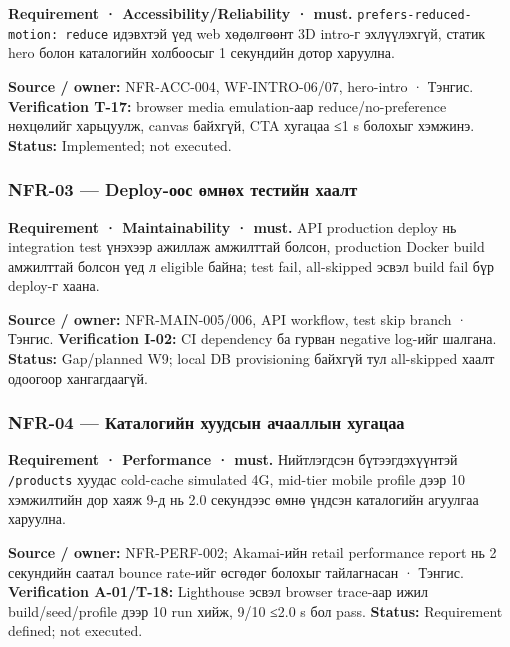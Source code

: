 \documentclass[
  mongolian,
]{article}
\begin{document}
\textbf{Requirement · Accessibility/Reliability · must.}
\texttt{prefers-reduced-motion:\ reduce} идэвхтэй үед web хөдөлгөөнт 3D
intro-г эхлүүлэхгүй, статик hero болон каталогийн холбоосыг 1 секундийн
дотор харуулна.

\textbf{Source / owner:} NFR-ACC-004, WF-INTRO-06/07, hero-intro ·
Тэнгис. \textbf{Verification T-17:} browser media emulation-аар
reduce/no-preference нөхцөлийг харьцуулж, canvas байхгүй, CTA хугацаа ≤1
s болохыг хэмжинэ. \textbf{Status:} Implemented; not executed.

\subsubsection{NFR-03 --- Deploy-оос өмнөх тестийн
хаалт}\label{nfr-03-deploy-ux43eux43eux441-ux4e9ux43cux43dux4e9ux445-ux442ux435ux441ux442ux438ux439ux43d-ux445ux430ux430ux43bux442}

\textbf{Requirement · Maintainability · must.} API production deploy нь
integration test үнэхээр ажиллаж амжилттай болсон, production Docker
build амжилттай болсон үед л eligible байна; test fail, all-skipped
эсвэл build fail бүр deploy-г хаана.

\textbf{Source / owner:} NFR-MAIN-005/006, API workflow, test skip
branch · Тэнгис. \textbf{Verification I-02:} CI dependency ба гурван
negative log-ийг шалгана. \textbf{Status:} Gap/planned W9; local DB
provisioning байхгүй тул all-skipped хаалт одоогоор хангагдаагүй.

\subsubsection{NFR-04 --- Каталогийн хуудсын ачааллын
хугацаа}\label{nfr-04-ux43aux430ux442ux430ux43bux43eux433ux438ux439ux43d-ux445ux443ux443ux434ux441ux44bux43d-ux430ux447ux430ux430ux43bux43bux44bux43d-ux445ux443ux433ux430ux446ux430ux430}

\textbf{Requirement · Performance · must.} Нийтлэгдсэн бүтээгдэхүүнтэй
\texttt{/products} хуудас cold-cache simulated 4G, mid-tier mobile
profile дээр 10 хэмжилтийн дор хаяж 9-д нь 2.0 секундээс өмнө үндсэн
каталогийн агуулгаа харуулна.

\textbf{Source / owner:} NFR-PERF-002; Akamai-ийн retail performance
report нь 2 секундийн саатал bounce rate-ийг өсгөдөг болохыг тайлагнасан
· Тэнгис. \textbf{Verification A-01/T-18:} Lighthouse эсвэл browser
trace-аар ижил build/seed/profile дээр 10 run хийж, 9/10 ≤2.0 s бол
pass. \textbf{Status:} Requirement defined; not executed.
\end{document}
